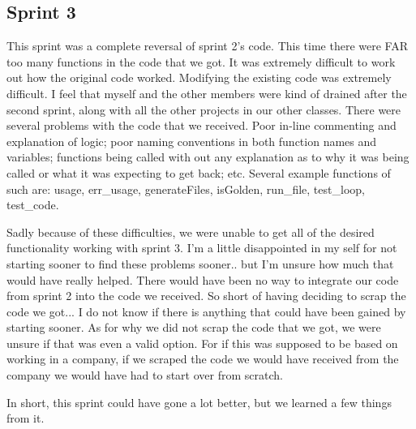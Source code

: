 \subsection{Sprint 3}
This sprint was a complete reversal of sprint 2's code. This time there were FAR too many functions in
the code that we got. It was extremely difficult to work out how the original code worked. Modifying the
existing code was extremely difficult. I feel that myself and the other members were kind of drained after
the second sprint, along with all the other projects in our other classes. There were several problems with
the code that we received. Poor in-line commenting and explanation of logic; poor naming conventions in both
function names and variables; functions being called with out any explanation as to why it was being called
or what it was expecting to get back; etc. Several example functions of such are: usage, err\_usage, generateFiles,
isGolden, run\_file, test\_loop, test\_code. 

Sadly because of these difficulties, we were unable to get all of
the desired functionality working with sprint 3. I'm a little disappointed in my self for not starting sooner
to find these problems sooner.. but I'm unsure how much that would have really helped. There would have been
no way to integrate our code from sprint 2 into the code we received. So short of having deciding to scrap
the code we got... I do not know if there is anything that could have been gained by starting sooner. As
for why we did not scrap the code that we got, we were unsure if that was even a valid option. For if this
was supposed to be based on working in a company, if we scraped the code we would have received from the company
we would have had to start over from scratch.

In short, this sprint could have gone a lot better, but we learned a few things from it.